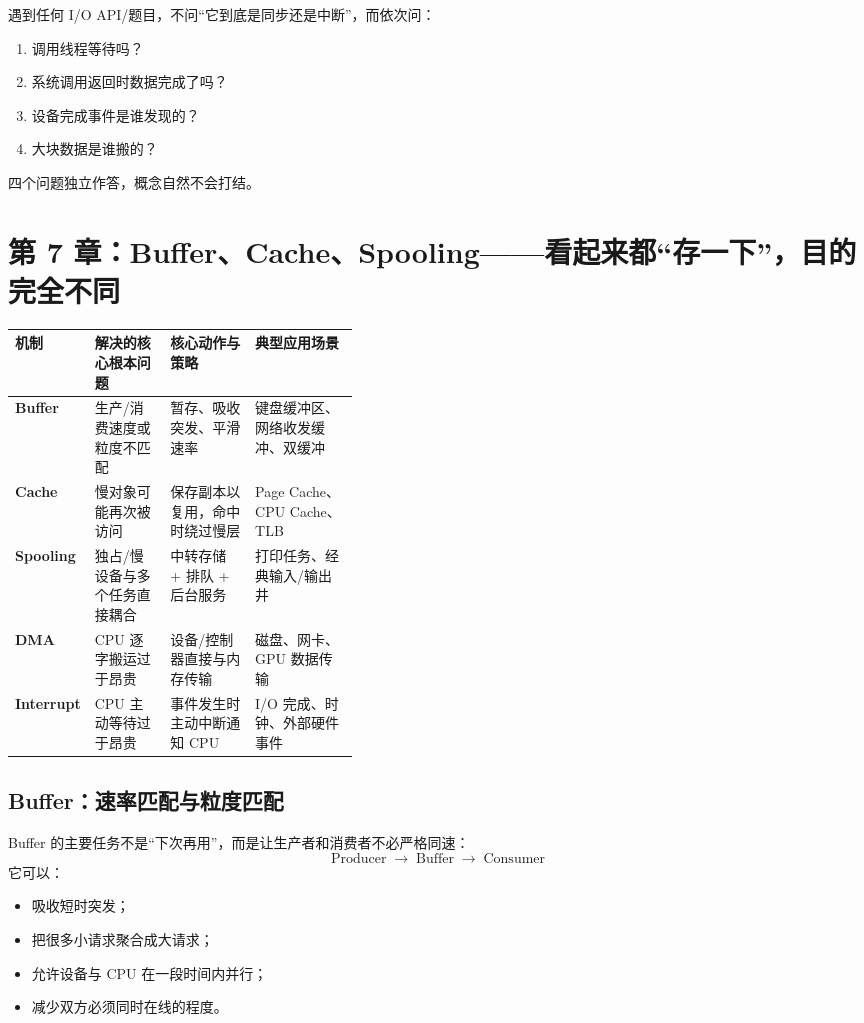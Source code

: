 \documentclass[11pt,a4paper]{ctexart}
\newcommand{\arr}{\;\longrightarrow\;}
\begin{document}
\begin{method}[四维判断法]
遇到任何 I/O API/题目，不问“它到底是同步还是中断”，而依次问：
\begin{enumerate}
  \item 调用线程等待吗？
  \item 系统调用返回时数据完成了吗？
  \item 设备完成事件是谁发现的？
  \item 大块数据是谁搬的？
\end{enumerate}
四个问题独立作答，概念自然不会打结。
\end{method}

\section{第 7 章：Buffer、Cache、Spooling——看起来都“存一下”，目的完全不同}

\begingroup
\small
\renewcommand{\arraystretch}{1.25}
\setlength{\tabcolsep}{6pt}
\begin{tabularx}{\linewidth}{>{\bfseries}p{0.18\linewidth} p{0.22\linewidth} X X}
\toprule
机制 & 解决的核心根本问题 & 核心动作与策略 & 典型应用场景 \\
\midrule
Buffer & 生产/消费速度或粒度不匹配 & 暂存、吸收突发、平滑速率 & 键盘缓冲区、网络收发缓冲、双缓冲 \\
Cache & 慢对象可能再次被访问 & 保存副本以复用，命中时绕过慢层 & Page Cache、CPU Cache、TLB \\
Spooling & 独占/慢设备与多个任务直接耦合 & 中转存储 + 排队 + 后台服务 & 打印任务、经典输入/输出井 \\
DMA & CPU 逐字搬运过于昂贵 & 设备/控制器直接与内存传输 & 磁盘、网卡、GPU 数据传输 \\
Interrupt & CPU 主动等待过于昂贵 & 事件发生时主动中断通知 CPU & I/O 完成、时钟、外部硬件事件 \\
\bottomrule
\end{tabularx}
\endgroup

\subsection{Buffer：速率匹配与粒度匹配}
Buffer 的主要任务不是“下次再用”，而是让生产者和消费者不必严格同速：
\[
\text{Producer}\arr\boxed{\text{Buffer}}\arr\text{Consumer}
\]
它可以：
\begin{itemize}
  \item 吸收短时突发；
  \item 把很多小请求聚合成大请求；
  \item 允许设备与 CPU 在一段时间内并行；
  \item 减少双方必须同时在线的程度。
\end{itemize}
\end{document}
